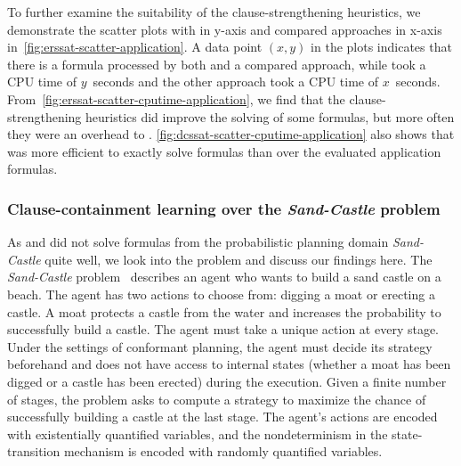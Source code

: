 To further examine the suitability of the clause-strengthening heuristics,
we demonstrate the scatter plots with \erssat in y-axis and compared approaches in x-axis
in~\cref{fig:erssat-scatter-application}.
A data point $(x,y)$ in the plots indicates that there is a formula processed by both \erssat and a compared approach,
while \erssat took a CPU time of $y$~seconds and the other approach took a CPU time of $x$~seconds.
From~\cref{fig:erssat-scatter-cputime-application},
we find that the clause-strengthening heuristics did improve the solving of some formulas,
but more often they were an overhead to \erssatb.
\cref{fig:dcssat-scatter-cputime-application} also shows that
\dcssat was more efficient to exactly solve formulas than \erssat over the evaluated application formulas.

\subsubsection{Clause-containment learning over the \textit{Sand-Castle} problem}
As \erssat and \erssatb did not solve formulas from the probabilistic planning domain \textit{Sand-Castle} quite well,
we look into the problem and discuss our findings here.
The \textit{Sand-Castle} problem~\cite{Majercik1998} describes an agent who wants to build a sand castle on a beach.
The agent has two actions to choose from: digging a moat or erecting a castle.
A moat protects a castle from the water and increases the probability to successfully build a castle.
The agent must take a unique action at every stage.
Under the settings of conformant planning,
the agent must decide its strategy beforehand and does not have access to internal states
(whether a moat has been digged or a castle has been erected) during the execution.
Given a finite number of stages,
the problem asks to compute a strategy to maximize the chance of successfully building a castle at the last stage.
The agent's actions are encoded with existentially quantified variables,
and the nondeterminism in the state-transition mechanism is encoded with randomly quantified variables.

